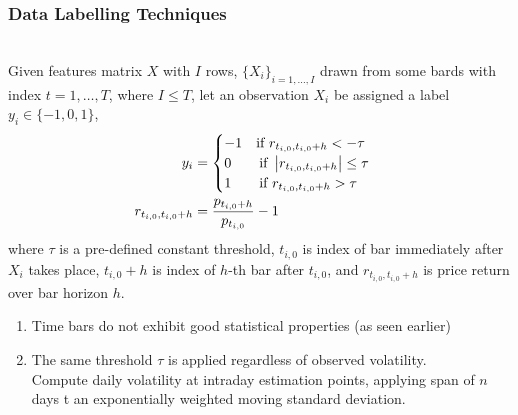 \subsubsection{Data Labelling Techniques}

\begin{method} \\
Given features matrix $X$ with $I$ rows, $\{X_i\}_{i = 1, \ldots, I}$ drawn from some bards with index $t = 1, \ldots, T$, where $I \leq T$, let an observation $X_i$ be assigned a label $y_i \in \{-1, 0, 1\}$,
\begin{align}
y_i &=
\begin{cases}
-1 \ \ \ \text{if } r_{t_{i,0}, t_{i,0} + h} < -\tau \\
0 \ \ \ \ \ \ \text{if } \left\lvert r_{t_{i,0}, t_{i,0} + h}\right\rvert \leq \tau \\
1 \ \ \ \ \ \ \text{if } r_{t_{i,0}, t_{i,0} + h} > \tau
\end{cases} \nonumber \\
r_{t_{i,0}, t_{i,0} + h} &= \frac{p_{t_{i,0}+h}}{p_{t_{i,0}}} - 1 \nonumber
\end{align}
where $\tau$ is a pre-defined constant threshold, $t_{i,0}$ is index of bar immediately after $X_i$ takes place, $t_{i,0} + h$ is index of $h$-th bar after $t_{i,0}$, and $r_{t_{i,0}, t_{i,0} + h}$ is price return over bar horizon $h$.
\end{method}

\begin{remark} 
\begin{enumerate}[label=\roman*.]
\setlength{\itemsep}{0pt}
\item Time bars do not exhibit good statistical properties (as seen earlier)
\item The same threshold $\tau$ is applied regardless of observed volatility.\\
Compute daily volatility at intraday estimation points, applying span of $n$ days t an exponentially weighted moving standard deviation.
\end{enumerate}
\end{remark}

